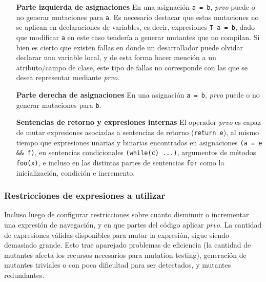 \begin{enumerate}[leftmargin=.75cm,align=left]
	\item[\textbf{Parte izquierda de asignaciones}] En una asignaci\'on \texttt{a = b}, \emph{prvo} puede o no generar mutaciones para \texttt{a}. Es necesario destacar que estas mutaciones no se aplican en declaraciones de variables, es decir, expresiones \texttt{T a = b}, dado que modificar \texttt{a} en este caso tender\'ia a generar mutantes que no compilan. Si bien es cierto que existen fallas en donde un desarrollador puede olvidar declarar una variable local, y de esta forma hacer menci\'on a un atributo/campo de clase, este tipo de fallas no corresponde con las que se desea representar mediante \emph{prvo}.
	
	\item[\textbf{Parte derecha de asignaciones}] En una asignaci\'on \texttt{a = b}, \emph{prvo} puede o no generar mutaciones para \texttt{b}.
	
	\item[\textbf{Sentencias de retorno y expresiones internas}] El operador \emph{prvo} es capaz de mutar expresiones asociadas a sentencias de retorno (\texttt{return e}), al mismo tiempo que expresiones unarias y binarias encontradas en asignaciones \texttt{(a = e \&\& f)}, en sentencias condicionales \texttt{(while(c) ...)}, argumentos de m\'etodos \texttt{foo(x)}, e incluso en las distintas partes de sentencias \texttt{for} como la inicializaci\'on, condici\'on e incremento.
\end{enumerate}

\subsubsection{Restricciones de expresiones a utilizar}

Incluso luego de configurar restricciones sobre cuanto disminuir o incrementar una expresi\'on de navegaci\'on, y en que partes del c\'odigo aplicar \emph{prvo}. La cantidad de expresiones v\'alidas disponibles para mutar la expresi\'on, sigue siendo demasiado grande. Esto trae aparejado problemas de eficiencia (la cantidad de mutantes afecta los recursos necesarios para mutation testing), generaci\'on de mutantes triviales o con poca dificultad para ser detectados, y mutantes redundantes.

